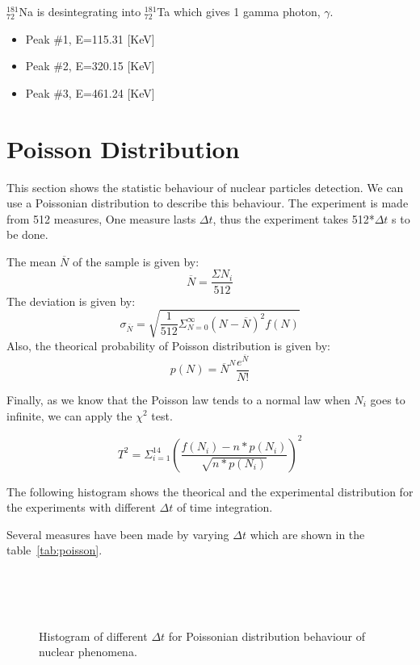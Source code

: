 \documentclass[a4paper,12pt,oneside]{article}
\begin{document}
$_{72}^{181}$Na is desintegrating into $_{72}^{181}$Ta which gives 1 gamma photon, $\gamma$.

\begin{itemize}
\item Peak \#1, E=115.31 [KeV]
\item Peak \#2, E=320.15 [KeV]
\item Peak \#3, E=461.24 [KeV]
\end{itemize}

\newpage
\section{Poisson Distribution}

This section shows the statistic behaviour of nuclear particles detection. We can use a Poissonian distribution to describe this behaviour.
The experiment is made from 512 measures, One measure lasts $\Delta t$, thus the experiment takes 512*$\Delta t$ s to be done.

The mean $\overline{N}$ of the sample is given by: $$\overline{N}=\frac{\Sigma N_i}{512}$$
The deviation is given by: $$\sigma_{\overline{N}}=\sqrt{\frac{1}{512}\Sigma^{\infty}_{N=0} (N-\overline{N})^2 f(N)}$$
Also, the theorical probability of Poisson distribution is given by: $$p(N)=\overline{N}^N \frac{e^{\overline{N}}}{N!}$$

Finally, as we know that the Poisson law tends to a normal law when $N_i$ goes to infinite, we can apply the $\chi^2$ test.

$$T^2=\Sigma^{14}_{i=1}{\left(\frac{f(N_i)-n*p(N_i)}{\sqrt{n*p(N_i)}}\right)^2}$$

The following histogram shows the theorical and the experimental distribution for the experiments with different $\Delta t$ of time integration.

Several measures have been made by varying $\Delta t$ which are shown in the table~\ref{tab:poisson}.

\begin{figure}[h!]
  \centering

  \\
  \\
  \\
  \label{figur}\caption{Histogram of different $\Delta t$ for Poissonian distribution behaviour of nuclear phenomena.}
\end{figure}
\end{document}
